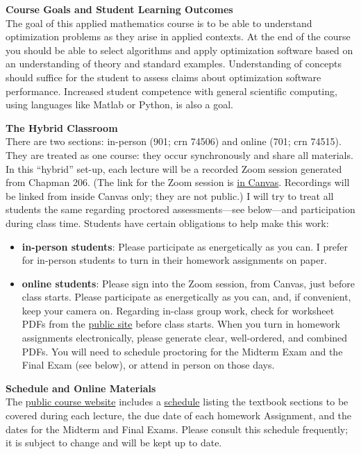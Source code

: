 \documentclass[12pt]{article}
\renewcommand{\emph}[1]{\textsf{\textbf{#1}}}
\newcommand{\localhead}[1]{\par\smallskip\textbf{#1} \smallskip\nobreak\\}%
\def\heading#1{\localhead{\large\emph{#1}}}
\begin{document}
\heading{Course Goals and Student Learning Outcomes}
The goal of this applied mathematics course is to be able to understand optimization problems as they arise in applied contexts.  At the end of the course you should be able to select algorithms and apply optimization software based on an understanding of theory and standard examples.  Understanding of concepts should suffice for the student to assess claims about optimization software performance.  Increased student competence with general scientific computing, using languages like Matlab or Python, is also a goal.

\heading{The Hybrid Classroom}
There are two sections: in-person (901; crn 74506) and online (701; crn 74515).  They are treated as one course: they occur synchronously and share all materials.  In this ``hybrid'' set-up, each lecture will be a recorded Zoom session generated from Chapman 206.  (The link for the Zoom session is \href{https://canvas.alaska.edu/courses/21663}{in Canvas}.  Recordings will be linked from inside Canvas only; they are not public.)  I will try to treat all students the same regarding proctored assessments---see below---and participation during class time.  Students have certain obligations to help make this work:
\begin{itemize}
\item \textbf{in-person students}: Please participate as energetically as you can.  I prefer for in-person students to turn in their homework assignments on paper.
\item \textbf{online students}:  Please sign into the Zoom session, from Canvas, just before class starts.  Please participate as energetically as you can, and, if convenient, keep your camera on.  Regarding in-class group work, check for worksheet PDFs from the \href{https://bueler.github.io/opt/}{public site} before class starts.  When you turn in homework assignments electronically, please generate clear, well-ordered, and combined PDFs.  You will need to schedule proctoring for the Midterm Exam and the Final Exam (see below), or attend in person on those days.
\end{itemize}

\heading{Schedule and Online Materials}
The \href{https://bueler.github.io/opt/}{public course website} includes a \href{https://bueler.github.io/opt/assets/general/F24/schedule.pdf}{schedule} listing the textbook sections to be covered during each lecture, the due date of each homework Assignment, and the dates for the Midterm and Final Exams.  Please consult this schedule frequently; it is subject to change and will be kept up to date.
\end{document}
